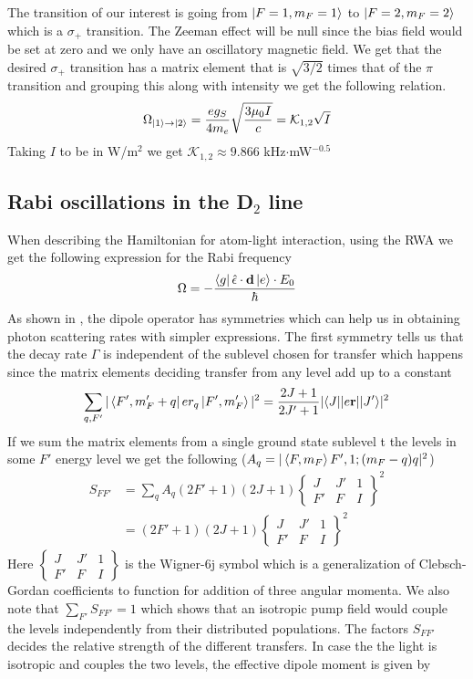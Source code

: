 \documentclass[%
 reprint,
 amsmath,amssymb,
 aps,
]{revtex4-2}
\begin{document}
The transition of our interest is going from $\ket{F=1,m_F=1}$ to $\ket{F=2,m_F=2}$ which is a $\sigma_+$ transition. The Zeeman effect will be null since the bias field would be set at zero and we only have an oscillatory magnetic field.
We get that the desired $\sigma_+$ transition has a matrix element that is $\sqrt{3/2}$ times that of the $\pi$ transition and grouping this along with intensity we get the following relation. 
\begin{equation}
    \Omega_{\ket{1}\to\ket{2}} = \dfrac{eg_S}{4m_e}\sqrt{\dfrac{3\mu_0I}{c}} = \mathcal{K}_{1,2}\sqrt{I}
\end{equation}
Taking $I$ to be in W/m$^2$ we get $\mathcal{K}_{1,2} \approx 9.866$ kHz$\cdot$mW$^{-0.5}$
\subsection{Rabi oscillations in the D$_2$ line}
When describing the Hamiltonian for atom-light interaction, using the RWA we get the following expression for the Rabi frequency
\begin{equation}
    \Omega = -\dfrac{\bra{g}\hat{\epsilon}\cdot \textbf{d}\ket{e}\cdot E_0}{\hbar}
\end{equation}
As shown in \cite{rb87dline}, the dipole operator has symmetries which can help us in obtaining photon scattering rates with simpler expressions. The first symmetry tells us that the decay rate $\Gamma$ is independent of the sublevel chosen for transfer which happens since the matrix elements deciding transfer from any level add up to a constant
\begin{equation}
    \sum_{q,F'}|\bra{F',m_F'+q}er_q\ket{F',m_F'}|^2 = \dfrac{2J+1}{2J'+1}|\langle J||e\textbf{r}||J'\rangle|^2
\end{equation}
If we sum the matrix elements from a single ground state sublevel t the levels in some $F'$ energy level we get the following ($A_q = |\braket{F,m_F}{F',1;(m_F-q)q}|^2$)
\begin{align}
    S_{FF'} &= \sum_{q}A_q(2F'+1)(2J+1)\begin{Bmatrix}J & J' & 1\\F' & F & I\end{Bmatrix}^2\nonumber\\
    &=(2F'+1)(2J+1)\begin{Bmatrix}J & J' & 1\\F' & F & I\end{Bmatrix}^2
\end{align}
Here $\begin{Bmatrix}J & J' & 1\\F' & F & I\end{Bmatrix}$ is the Wigner-6j symbol \cite{wigner6j} which is a generalization of Clebsch-Gordan coefficients to function for addition of three angular momenta. We also note that $\sum_{F'}S_{FF'} = 1$ which shows that an isotropic pump field would couple the levels independently from their distributed populations. The factors $S_{FF'}$ decides the relative strength of the different transfers. In case the the light is isotropic and couples the two levels, the effective dipole moment is given by
\end{document}
